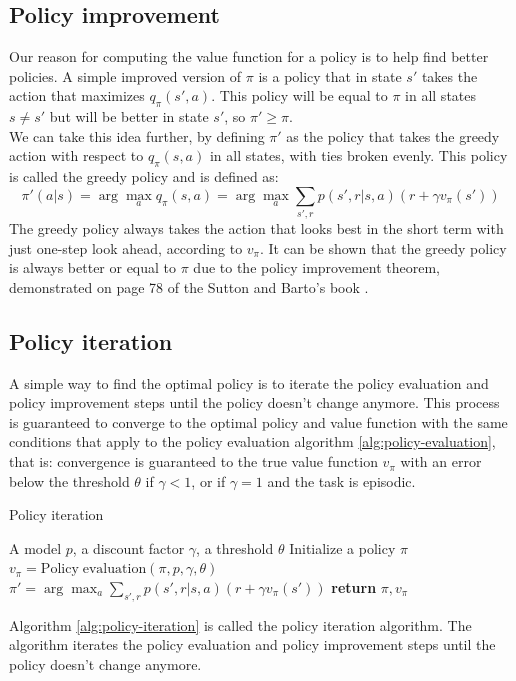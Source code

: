 \subsection{Policy improvement}
Our reason for computing the value function for a policy is to help find better policies. A simple improved version of $\pi$ is a policy that in state $s'$ takes the action that maximizes $q_{\pi}(s', a)$. This policy will be equal to $\pi$ in all states $s \neq s'$ but will be better in state $s'$, so $\pi' \geq \pi$.\\
We can take this idea further, by defining $\pi'$ as the policy that takes the greedy action with respect to $q_{\pi}(s, a)$ in all states, with ties broken evenly. This policy is called the greedy policy and is defined as:
\begin{equation}
    \pi'(a | s) = \arg \max_a q_{\pi}(s, a) = \arg \max_a \sum_{s', r} p(s', r | s, a) (r + \gamma v_{\pi}(s'))
    \label{greedy-policy}
\end{equation}
The greedy policy always takes the action that looks best in the short term with just one-step look ahead, according to $v_{\pi}$. It can be shown that the greedy policy is always better or equal to $\pi$ due to the policy improvement theorem, demonstrated on page 78 of the Sutton and Barto's book \cite{sutton-barto}.

\subsection{Policy iteration}
A simple way to find the optimal policy is to iterate the policy evaluation and policy improvement steps until the policy doesn't change anymore. This process is guaranteed to converge to the optimal policy and value function with the same conditions that apply to the policy evaluation algorithm \ref{alg:policy-evaluation}, that is: convergence is guaranteed to the true value function $v_{\pi}$ with an error below the threshold $\theta$ if $\gamma < 1$, or if $\gamma = 1$ and the task is episodic.
\begin{algorithm}[H]
    \caption{Policy iteration}
    \label{alg:policy-iteration}
    \begin{algorithmic}[1]
        \Require A model $p$, a discount factor $\gamma$, a threshold $\theta$
        \State Initialize a policy $\pi$
            \State $v_{\pi} = \mathrm{Policy \; evaluation} (\pi, p, \gamma, \theta)$ 
            \State $\pi' = \arg \max_a \sum_{s', r} p(s', r | s, a) (r + \gamma v_{\pi}(s'))$ 
                \State \textbf{return} $\pi, v_{\pi}$
            \EndIf
        \EndWhile
    \end{algorithmic}
\end{algorithm}
Algorithm \ref{alg:policy-iteration} is called the policy iteration algorithm. The algorithm iterates the policy evaluation and policy improvement steps until the policy doesn't change anymore.

